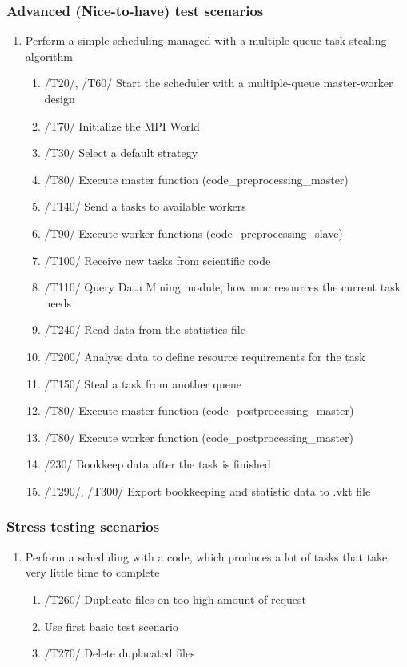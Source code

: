 {		
		\subsubsection{Advanced (Nice-to-have) test scenarios}
			\begin{enumerate}
							
			\item Perform a simple scheduling managed with a multiple-queue task-stealing algorithm
				\begin{enumerate}
				
				\item /T20/, /T60/ Start the scheduler with a multiple-queue master-worker design
				\item /T70/ Initialize the MPI World
				\item /T30/ Select a default strategy
				\item /T80/ Execute master function (code\_preprocessing\_master)
				\item /T140/ Send a tasks to available workers
				\item /T90/ Execute worker functions (code\_preprocessing\_slave)
				\item /T100/ Receive new tasks from scientific code
				\item /T110/ Query Data Mining module, how muc resources the current task needs
				\item /T240/ Read data from the statistics file
				\item /T200/ Analyse data to define resource requirements for the task
				\item /T150/ Steal a task from another queue
				\item /T80/ Execute master function (code\_postprocessing\_master)
				\item /T80/ Execute worker function (code\_postprocessing\_master)
				\item /230/ Bookkeep data after the task is finished
				\item /T290/, /T300/ Export bookkeeping and statistic data to .vkt file
				
				\end{enumerate}
		     \end{enumerate}	
		     
		   \subsubsection{Stress testing scenarios}
		   
		   \begin{enumerate}
		   	 \item Perform a scheduling with a code, which produces a lot of tasks that take very little time to complete
		   	   \begin{enumerate}
		   	   \item /T260/ Duplicate files on too high amount of request
		   			\item Use first basic test scenario 
		   			\item /T270/ Delete duplacated files
		   			

\end{enumerate}
\end{enumerate}}
